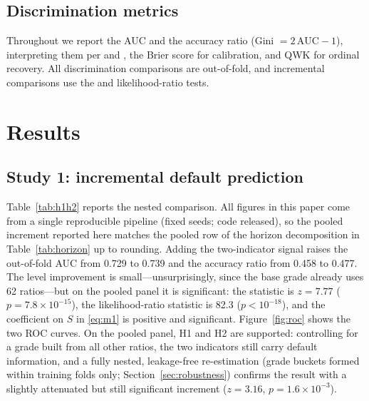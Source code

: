 \documentclass[pdflatex,sn-mathphys-ay]{sn-jnl}
\begin{document}
\subsection{Discrimination metrics}
Throughout we report the AUC and the accuracy ratio (Gini $=2\,\text{AUC}-1$), interpreting them per
\citet{hanley1982} and \citet{engelmann2003}, the Brier score for calibration, and QWK for ordinal
recovery. All discrimination comparisons are out-of-fold, and incremental comparisons use the
\citet{delong1988} and likelihood-ratio tests.

\section{Results}\label{sec:results}

\subsection{Study 1: incremental default prediction}
Table~\ref{tab:h1h2} reports the nested comparison. All figures in this paper come from a single
reproducible pipeline (fixed seeds; code released), so the pooled increment reported here matches the
pooled row of the horizon decomposition in Table~\ref{tab:horizon} up to rounding. Adding the two-indicator
signal raises the out-of-fold AUC from 0.729 to 0.739 and the accuracy ratio from 0.458 to 0.477. The
level improvement is small---unsurprisingly, since the base grade already uses 62 ratios---but on the
pooled panel it is significant: the \citet{delong1988} statistic is $z=7.77$ ($p=7.8\times10^{-15}$),
the likelihood-ratio statistic is 82.3 ($p<10^{-18}$), and the coefficient on $S$ in \eqref{eq:m1} is
positive and significant.
Figure~\ref{fig:roc} shows the two ROC curves. On the pooled panel, H1 and H2 are supported:
controlling for a grade built from all other ratios, the two indicators still carry default
information, and a fully nested, leakage-free re-estimation (grade buckets formed within training
folds only; Section~\ref{sec:robustness}) confirms the result with a slightly attenuated but still
significant increment ($z=3.16$, $p=1.6\times10^{-3}$).
\end{document}
